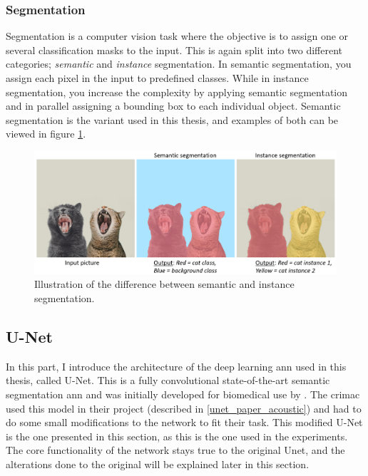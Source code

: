\subsubsection{Segmentation}
    Segmentation is a computer vision task where the objective is to assign one or several classification masks to the input\cite{He_2017_ICCV_segmentation}. This is again split into two different categories; \textit{semantic} and \textit{instance} segmentation. In semantic segmentation, you assign each pixel in the input to predefined classes. While in instance segmentation, you increase the complexity by applying semantic segmentation and in parallel assigning a bounding box to each individual object. Semantic segmentation is the variant used in this thesis, and examples of both can be viewed in figure \ref{segmentation_fig}.
    
    \begin{figure}[H]
        \centering
        \includegraphics[scale=0.4]{figures/segmentation.png}
        \caption[Difference between semantic and instance segmentation]{Illustration of the difference between semantic and instance segmentation.}
      	\medskip 
        \label{segmentation_fig}
    \end{figure}
    
    

\subsection{U-Net} \label{unet}
    In this part, I introduce the architecture of the deep learning \gls{ann} used in this thesis, called U-Net. This is a fully convolutional state-of-the-art\cite{rajak2021segmentation} semantic segmentation \gls{ann} and was initially developed for biomedical use by \citeauthor{unet_ronneberger2015}\cite{unet_ronneberger2015}. The \gls{crimac} used this model in their project (described in \ref{unet_paper_acoustic}) and had to do some small modifications to the network to fit their task. This modified U-Net is the one presented in this section, as this is the one used in the experiments. The core functionality of the network stays true to the original Unet, and the alterations done to the original will be explained later in this section.
    
